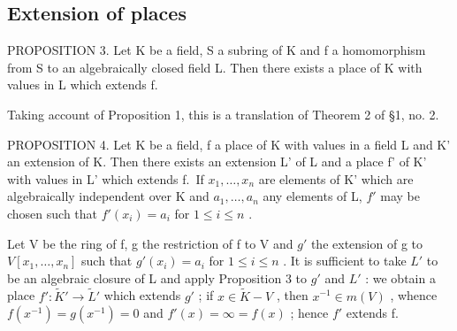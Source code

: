 \subsection{Extension of places}

PROPOSITION 3. Let K be a field, S a subring of K and f a homomorphism from S to an algebraically closed field L. Then there exists a place of K with values in L which extends f.

Taking account of Proposition 1, this is a translation of Theorem 2 of §1, no. 2.

PROPOSITION 4. Let K be a field, f a place of K with values in a field L and K' an extension of K. Then there exists an extension L' of L and a place f' of K' with values in L' which extends f.~If \(x_{1}, \ldots, x_{n}\) are elements of K' which are algebraically independent over K and \(a_1, \ldots, a_n\) any elements of L, \(f'\) may be chosen such that \(f'(x_i) = a_i\) for \(1 \leqslant i \leqslant n\) .

Let V be the ring of f, g the restriction of f to V and \(g'\) the extension of g to \(V[x_{1},\ldots,x_{n}]\) such that \(g'(x_{i}) = a_{i}\) for \(1 \leqslant i \leqslant n\) . It is sufficient to take \(L'\) to be an algebraic closure of L and apply Proposition 3 to \(g'\) and \(L'\) : we obtain a place \(f'\colon \tilde{K}' \to \tilde{L}'\) which extends \(g'\) ; if \(x \in \tilde{K} - V\) , then \(x^{-1} \in m(V)\) , whence \(f(x^{-1}) = g(x^{-1}) = 0\) and \(f'(x) = \infty = f(x)\) ; hence \(f'\) extends f.

